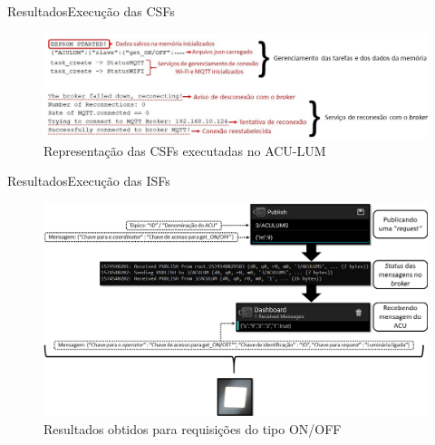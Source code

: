 \begin{frame}{Resultados}{Execução das CSFs}
\vspace{-0.64cm}
\begin{figure}[htp]
	\centering
	\caption{ \centering\small{{Representação das CSFs executadas no ACU-LUM}}}
	\includegraphics[width=1\linewidth]{img/apCSF.jpg}
    \hspace{5cm}
    \vspace{1cm}
\end{figure}
\end{frame}

\begin{frame}{Resultados}{Execução das ISFs}
\vspace{-0.6cm}
\begin{figure}[htp]
	\centering
	\caption{ \centering\small{{Resultados obtidos para requisições do tipo ON/OFF}}}
	\includegraphics[width=0.98\linewidth]{img/isf1.png}
    \hspace{5cm}
    \vspace{1cm}
\end{figure}
\end{frame}

